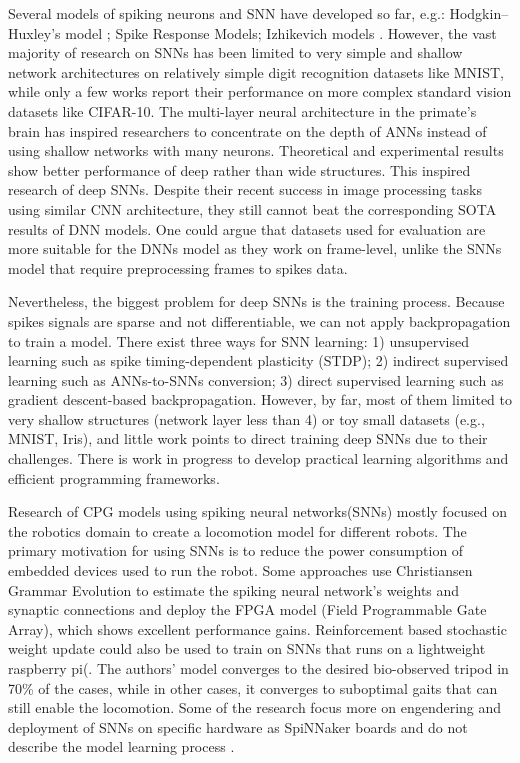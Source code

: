 Several models of spiking neurons and SNN have developed so far, e.g.: Hodgkin–Huxley’s model  \cite{ref16}; Spike Response Models\cite{ref17}\cite{ref18}; Izhikevich models \cite{ref19}. However, the vast majority of research on SNNs has been limited to very simple and shallow network architectures on relatively simple digit recognition datasets like MNIST, while only a few works report their performance on more complex standard vision datasets like CIFAR-10. The multi-layer neural architecture in the primate’s brain has inspired researchers to concentrate on the depth of ANNs instead of using shallow networks with many neurons. Theoretical and experimental results show better performance of deep rather than wide structures. This inspired research of deep SNNs. Despite their recent success in image processing tasks using similar CNN architecture, they still cannot beat the corresponding SOTA results of DNN models. One could argue that datasets used for evaluation are more suitable for the DNNs model as they work on frame-level, unlike the SNNs model that require preprocessing frames to spikes data.

Nevertheless, the biggest problem for deep SNNs is the training process. Because spikes signals are sparse and not differentiable, we can not apply backpropagation to train a model. There exist three ways for SNN learning: 1) unsupervised learning such as spike timing-dependent plasticity (STDP); 2) indirect supervised learning such as ANNs-to-SNNs conversion; 3) direct supervised learning such as gradient descent-based backpropagation. However, by far, most of them limited to very shallow structures (network layer less than 4) or toy small datasets (e.g., MNIST, Iris), and little work points to direct training deep SNNs due to their challenges. There is work in progress to develop practical learning algorithms and efficient programming frameworks.\cite{ref20}

Research of CPG models using spiking neural networks(SNNs) mostly focused on the robotics domain to create a locomotion model for different robots. The primary motivation for using SNNs is to reduce the power consumption of embedded devices used to run the robot. Some approaches use Christiansen Grammar Evolution to estimate the spiking neural network's weights and synaptic connections and deploy the FPGA model (Field Programmable Gate Array), which shows excellent performance gains.\cite{ref21} Reinforcement based stochastic weight update could also be used to train on SNNs that runs on a lightweight raspberry pi(\cite{ref22}. The authors' model converges to the desired bio-observed tripod in 70\% of the cases, while in other cases, it converges to suboptimal gaits that can still enable the locomotion. Some of the research focus more on engendering and deployment of SNNs on specific hardware as SpiNNaker boards and do not describe the model learning process \cite{ref23} \cite{ref24}.

